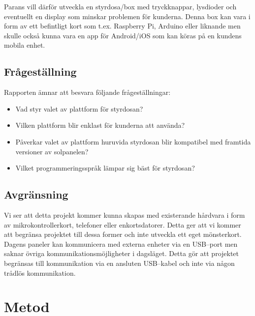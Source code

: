 \documentclass{article}
\begin{document}
            \noindent Parans vill därför utveckla en styrdosa/box med tryckknappar, lysdioder och eventuellt en display som minskar problemen för kunderna. Denna box kan vara i form av ett befintligt kort som t.ex. Raspberry Pi, Arduino eller liknande men skulle också kunna vara en app för Android/iOS som kan köras på en kundens mobila enhet.

        \subsection{Frågeställning} %
        \label{sub:fragestallning}
        Rapporten ämnar att besvara följande frågeställningar:\\
        \begin{itemize}
            \item Vad styr valet av plattform för styrdosan?
            \item Vilken plattform blir enklast för kunderna att använda?
            \item Påverkar valet av plattform huruvida styrdosan blir kompatibel med framtida versioner av solpanelen?
            \item Vilket programmeringsspråk lämpar sig bäst för styrdosan?
        \end{itemize}   
        


        \subsection{Avgränsning} %
        \label{sub:avgransning}
            Vi ser att detta projekt kommer kunna skapas med existerande hårdvara i form av mikrokontrollerkort, telefoner eller enkortsdatorer. Detta ger att vi kommer att begränsa projektet till dessa former och inte utveckla ett eget mönsterkort.\\

            \noindent Dagens paneler kan kommunicera med externa enheter via en USB--port men saknar övriga kommunikationsmöjligheter i dagsläget. Detta gör att projektet begränsas till kommunikation via en ansluten USB--kabel och inte via någon trådlös kommunikation.

    \section{Metod} %
    \label{sec:metod}
\end{document}
